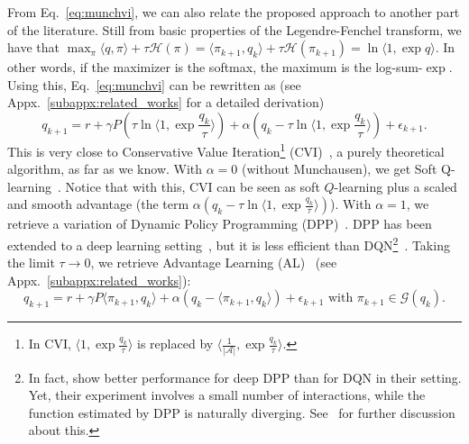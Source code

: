 \documentclass{article}
\newcommand{\gr}{\mathcal{G}}
\newcommand{\h}{\mathcal{H}}
\newcommand{\actions}{\mathcal{A}}
\begin{document}
From Eq.~\eqref{eq:munchvi}, we can also relate the proposed approach to another part of the literature. Still from basic properties of the Legendre-Fenchel transform, we have that $\max_\pi \langle q,\pi\rangle + \tau \h(\pi) = \langle\pi_{k+1},q_k\rangle + \tau\h(\pi_{k+1}) = \ln\langle 1, \exp q\rangle$. In other words, if the maximizer is the softmax, the maximum is the log-sum-$\exp$. Using this, Eq.~\eqref{eq:munchvi} can be rewritten as (see Appx.~\ref{subappx:related_works} for a detailed derivation)
\begin{equation}
    q_{k+1} = r + \gamma P(\tau \ln\langle 1, \exp\frac{q_k}{\tau}\rangle) + \alpha(q_k - \tau \ln\langle 1, \exp\frac{q_k}{\tau}\rangle) + \epsilon_{k+1}.
    \label{eq:cvi}
\end{equation}
This is very close to Conservative Value Iteration\footnote{In CVI, $\langle 1, \exp\frac{q_k}{\tau}\rangle$ is replaced by $\langle \frac{1}{|\actions|}, \exp\frac{q_k}{\tau}\rangle$.} (CVI)~\cite{kozuno2019theoretical}, a purely theoretical algorithm, as far as we know. With $\alpha=0$ (without Munchausen), we get Soft Q-learning~\cite{fox2015taming,haarnoja2017reinforcement}. Notice that with this, CVI can be seen as soft $Q$-learning plus a scaled and smooth advantage (the term $\alpha(q_k - \tau \ln\langle 1, \exp\frac{q_k}{\tau}\rangle)$). With $\alpha=1$, we retrieve a variation of Dynamic Policy Programming (DPP)~\cite[Appx.~A]{azar2012dynamic}.
DPP has been extended to a deep learning setting~\cite{tsurumine2017deep}, but it is less efficient than DQN\footnote{
In fact, \citet{tsurumine2017deep} show better performance for deep DPP than for DQN in their setting. Yet, their experiment involves a small number of interactions, while the function estimated by DPP is naturally diverging. See~\cite[Sec.~6]{vieillard2019momentum} for further discussion about this.
}~\cite{vieillard2020leverage}.
Taking the limit $\tau\rightarrow 0$, we retrieve Advantage Learning (AL)~\cite{baird1999reinforcement,bellemare2016increasing} (see Appx.~\ref{subappx:related_works}):
\begin{equation}
    q_{k+1} = r + \gamma P\langle \pi_{k+1},q_k\rangle + \alpha (q_k - \langle \pi_{k+1}, q_k\rangle) + \epsilon_{k+1} \text{ with } \pi_{k+1} \in\gr(q_k).
    \label{eq:al}
\end{equation}
\end{document}
